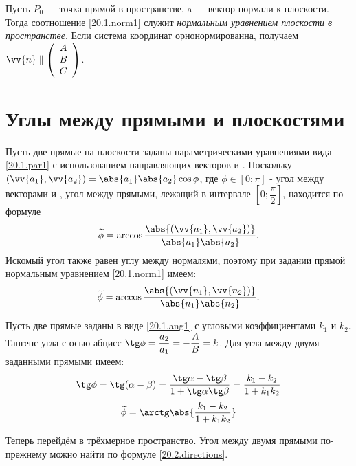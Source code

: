   Пусть $P_0$ --- точка прямой в пространстве, a  --- вектор нормали к плоскости. Тогда соотношение \eqref{20.1.norm1} служит \textit{нормальным уравнением плоскости в пространстве}. Если система координат орнонормированна, получаем $\vv{n}\parallel\left(\begin{array}{crl}
A\\
B\\
C\\
\end{array}\right)$.

\section{Углы между прямыми и плоскостями}

  Пусть две прямые на плоскости заданы параметрическими уравнениями вида \eqref{20.1.par1} с использованием направляющих векторов  и . Поскольку $(\vv{a_1},\vv{a_2})=\abs{a_1}\abs{a_2}\cos \phi$, где $\phi \in \left[0;\pi\right]$ - угол между векторами  и , угол между прямыми, лежащий в интервале $\left[0;\dfrac \pi 2\right]$, находится по формуле
  \begin{equation}\label{20.2.directions}
  \widetilde\phi=\arccos\dfrac{\abs{(\vv{a_1},\vv{a_2})}}{\abs{a_1}\abs{a_2}}.
  \end{equation}
  Искомый угол также равен углу между нормалями, поэтому при задании прямой нормальным уравнением \eqref{20.1.norm1} имеем:
  \begin{equation}\label{20.2.normals}
  \widetilde\phi=\arccos\dfrac{\abs{(\vv{n_1},\vv{n_2})}}{\abs{n_1}\abs{n_2}}.
  \end{equation}
  
  Пусть две прямые заданы в виде \eqref{20.1.ang1} с угловыми коэффициентами $k_1$ и $k_2$. Тангенс угла с осью абцисс $\tg \phi = \dfrac{a_2}{a_1}=-\dfrac{A}{B}=k$. Для угла между двумя заданными прямыми имеем:
  \begin{equation}
  \tg \phi=\tg (\alpha-\beta)=\dfrac{\tg \alpha - \tg \beta}{1+\tg \alpha \tg \beta}=\dfrac{k_1-k_2}{1+k_1k_2}
  \end{equation}
  \begin{equation}\label{20.2.angles}
  \widetilde \phi = \arctg \abs{\dfrac{k_1-k_2}{1+k_1k_2}}
  \end{equation}
  
  Теперь перейдём в трёхмерное пространство. Угол между двумя прямыми по-прежнему можно найти по формуле \eqref{20.2.directions}. 
  
